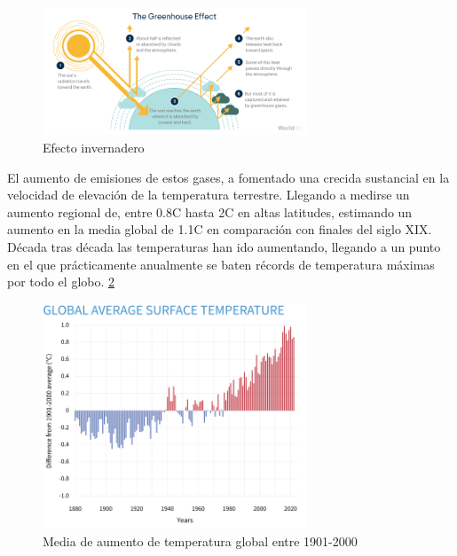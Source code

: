 \begin{figure} [H]
	\centering
	\includegraphics[width=0.7\textwidth]{fig/climate-change_greenhouse-effect_steps.png}
	\caption[Efecto invernadero]{Efecto invernadero \footnotemark}
	\label{fig:ej17}
\end{figure}

El aumento de emisiones de estos gases, a fomentado una crecida sustancial en la velocidad de elevación de la temperatura terrestre. Llegando a medirse un aumento regional de, entre 0.8\textdegree C hasta 2\textdegree C en altas latitudes, estimando un aumento en la media global de 1.1\textdegree C en comparación con finales del siglo XIX. \cite{ruddiman2003anthropogenic}\newline
\newline
Década tras década las temperaturas han ido aumentando, llegando a un punto en el que prácticamente anualmente se baten récords de temperatura máximas por todo el globo. \ref{fig:ej18} \cite{NCEIWeb}

\begin{figure} [H]
	\centering
	\includegraphics[width=0.7\textwidth]{fig/ClimateDashboard-global-surface-temperature-graph-20230118-1400px.png}
	\caption[Media de aumento de temperatura global entre 1901-2000]{Media de aumento de temperatura global entre 1901-2000 \footnotemark}
	\label{fig:ej18}
\end{figure}


